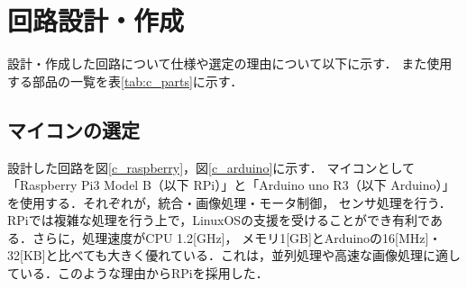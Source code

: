 \documentclass[11pt,a4]{jsarticle}
\begin{document}
\newpage

\section{回路設計・作成}
設計・作成した回路について仕様や選定の理由について以下に示す．
また使用する部品の一覧を表\ref{tab:c_parts}に示す．

\subsection{マイコンの選定}
設計した回路を図\ref{c_raspberry}，図\ref{c_arduino}に示す．
マイコンとして「Raspberry Pi3 Model B（以下 RPi）」と「Arduino uno R3（以下 Arduino）」を使用する．それぞれが，統合・画像処理・モータ制御，
センサ処理を行う．RPiでは複雑な処理を行う上で，LinuxOSの支援を受けることができ有利である．さらに，処理速度がCPU 1.2[GHz]，
メモリ1[GB]とArduinoの16[MHz]・32[KB]と比べても大きく優れている．これは，並列処理や高速な画像処理に適している．このような理由からRPiを採用した．
\end{document}
